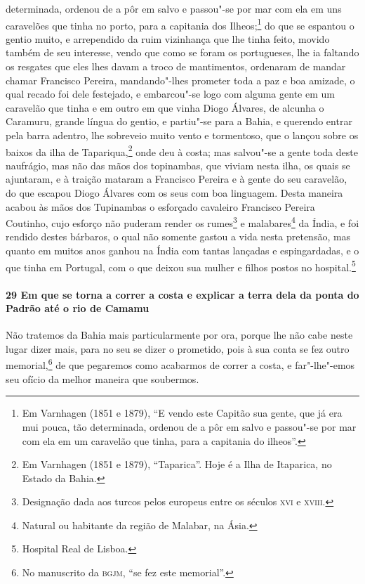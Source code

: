 determinada, ordenou de a pôr em salvo e passou"-se por mar com ela em uns caravelões que
tinha no porto, para a capitania dos Ilheos;\footnote{ Em Varnhagen (1851 e 1879), ``E
vendo este Capitão sua gente, que já era mui pouca, tão determinada, ordenou de a pôr em
salvo e passou"-se por mar com ela em um caravelão que tinha, para a capitania do
ilheos''.} do que se espantou o gentio muito, e arrependido da ruim vizinhança que lhe
tinha feito, movido também de seu interesse, vendo que como se foram os portugueses, lhe
ia faltando os resgates que eles lhes davam a troco de mantimentos, ordenaram de mandar
chamar Francisco Pereira, mandando"-lhes prometer toda a paz e boa amizade, o qual recado
foi dele festejado, e embarcou"-se logo com alguma gente em um caravelão que tinha e em
outro em que vinha Diogo Álvares, de alcunha o Caramuru, grande língua do gentio, e
partiu"-se para a Bahia, e querendo entrar pela barra adentro, lhe sobreveio muito vento e
tormentoso, que o lançou sobre os baixos da ilha de Tapariqua,\footnote{ Em Varnhagen (1851
e 1879), ``Taparica''. Hoje é a Ilha de Itaparica, no Estado da Bahia.} onde deu à costa;
mas salvou"-se a gente toda deste naufrágio, mas não das mãos dos topinambas, que viviam
nesta ilha, os quais se ajuntaram, e à traição mataram a Francisco Pereira e à gente do
seu caravelão, do que escapou Diogo Álvares com os seus com boa linguagem. Desta maneira
acabou às mãos dos Tupinambas o esforçado cavaleiro Francisco Pereira Coutinho, cujo
esforço não puderam render os rumes\footnote{ Designação dada aos turcos pelos europeus
entre os séculos \textsc{xvi} e \textsc{xviii}.} e malabares\footnote{ Natural ou
habitante da região de Malabar, na Ásia.} da Índia, e foi rendido destes bárbaros, o qual
não somente gastou a vida nesta pretensão, mas quanto em muitos anos ganhou na Índia com
tantas lançadas e espingardadas, e o que tinha em Portugal, com o que deixou sua mulher e
filhos postos no hospital.\footnote{ Hospital Real de Lisboa.}

\paragraph{29 Em que se torna a correr a costa e explicar a terra dela da ponta do Padrão
até o rio de Camamu}

Não tratemos da Bahia mais particularmente por ora, porque lhe não cabe neste lugar dizer
mais, para no seu se dizer o prometido, pois à sua conta se fez outro memorial,\footnote{
No manuscrito da \textsc{bgjm}, ``se fez este memorial''.} de que pegaremos como acabarmos
de correr a costa, e far"-lhe"-emos seu ofício da melhor maneira que soubermos.

